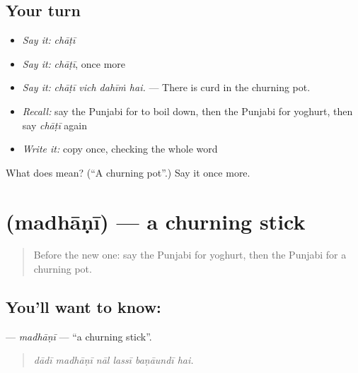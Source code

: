 \subsection*{Your turn}
\begin{itemize}
\raggedright
  \item \emph{Say it:} \emph{chāṭī}
  \item \emph{Say it:} \emph{chāṭī}, once more
  \item \emph{Say it:} \emph{chāṭī vich dahīṁ hai.} — There is curd in the churning pot.
  \item \emph{Recall:} say the Punjabi for to boil down, then the Punjabi for yoghurt, then say \emph{chāṭī} again
  \item \emph{Write it:} copy \textbf{} once, checking the whole word
\end{itemize}

\begin{tcolorbox}[breakable,colback=teal!4,colframe=teal!35!black,title={Before you move on}]
What does  mean? (\textquotedblleft{}A churning pot\textquotedblright{}.) Say it once more.
\end{tcolorbox}
\section[\texorpdfstring{\pa{ਮਧਾਣੀ} (madhāṇī)}{ਮਧਾਣੀ (madhāṇī)}]{ (madhāṇī) — a churning stick}

\label{lesson:PA-C237-madhani}



\begin{quote}
Before the new one: say the Punjabi for yoghurt, then the Punjabi for a churning pot.
\end{quote}

\subsection*{You'll want to know: }
\textbf{} — \emph{madhāṇī} — \textquotedblleft{}a churning stick\textquotedblright{}.

\begin{quote}
     
\end{quote}

\begin{quote}
\emph{dādī madhāṇī nāl lassī baṇāundī hai.}
\end{quote}


